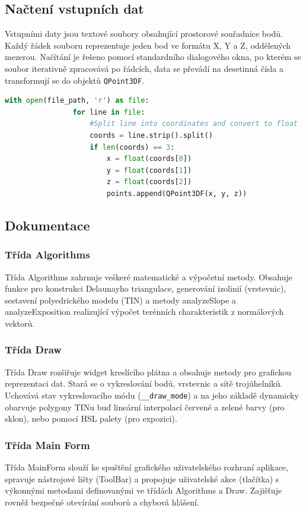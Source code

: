 \subsection{Načtení vstupních dat}
Vstupními daty jsou textové soubory obsahující prostorové souřadnice bodů. Každý řádek souboru reprezentuje jeden bod ve formátu X, Y a Z, oddělených mezerou. Načítání je řešeno pomocí standardního dialogového okna, po kterém se soubor iterativně zpracovává po řádcích, data se převádí na desetinná čísla a transformují se do objektů \texttt{QPoint3DF}.
\begin{lstlisting}[language=Python, caption = Použití souřadnic z textového souboru.]
    with open(file_path, 'r') as file:
                for line in file:
                    #Split line into coordinates and convert to float
                    coords = line.strip().split()
                    if len(coords) == 3:
                        x = float(coords[0])
                        y = float(coords[1])
                        z = float(coords[2])
                        points.append(QPoint3DF(x, y, z))
\end{lstlisting}


\subsection{Dokumentace}
\subsubsection{Třída Algorithms}
Třída Algorithms zahrnuje veškeré matematické a výpočetní metody. Obsahuje funkce pro konstrukci Delaunayho triangulace, generování izolinií (vrstevnic), sestavení polyedrického modelu (TIN) a metody analyzeSlope a analyzeExposition realizující výpočet terénních charakteristik z normálových vektorů.

\subsubsection{Třída Draw}
Třída Draw rozšiřuje widget kreslícího plátna a obsahuje metody pro grafickou reprezentaci dat. Stará se o vykreslování bodů, vrstevnic a sítě trojúhelníků. Uchovává stav vykreslovacího módu (\texttt{\_\_draw\_mode}) a na jeho základě dynamicky obarvuje polygony TINu buď lineární interpolací červené a zelené barvy (pro sklon), nebo pomocí HSL palety (pro expozici).

\subsubsection{Třída Main Form}
Třída MainForm slouží ke spuštění grafického uživatelského rozhraní aplikace, spravuje nástrojové lišty (ToolBar) a propojuje uživatelské akce (tlačítka) s výkonnými metodami definovanými ve třídách Algorithms a Draw. Zajišťuje rovněž bezpečné otevírání souborů a chybová hlášení.

